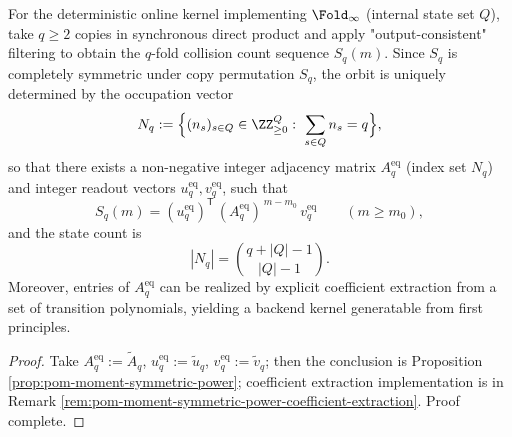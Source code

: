 \begin{conclusion}\label{con:xi-terminal-sympower-quotient-kernel-poly-state}
For the deterministic online kernel implementing \(\Fold_\infty\) (internal state set \(Q\)), take \(q\ge 2\) copies in synchronous direct product and apply "output-consistent" filtering to obtain the \(q\)-fold collision count sequence \(S_q(m)\).
Since \(S_q\) is completely symmetric under copy permutation \(S_q\), the orbit is uniquely determined by the occupation vector
\[
N_q:=\Bigl\{(n_s)_{s\in Q}\in\ZZ_{\ge 0}^{Q}:\ \sum_{s\in Q}n_s=q\Bigr\},
\]
so that there exists a non-negative integer adjacency matrix \(A^{\mathrm{eq}}_q\) (index set \(N_q\)) and integer readout vectors \(u^{\mathrm{eq}}_q,v^{\mathrm{eq}}_q\), such that
\[
S_q(m)= (u^{\mathrm{eq}}_q)^{\mathsf T}\,(A^{\mathrm{eq}}_q)^{\,m-m_0}\,v^{\mathrm{eq}}_q\qquad(m\ge m_0),
\]
and the state count is
\[
|N_q|=\binom{q+|Q|-1}{|Q|-1}.
\]
Moreover, entries of \(A^{\mathrm{eq}}_q\) can be realized by explicit coefficient extraction from a set of transition polynomials, yielding a backend kernel generatable from first principles.
\end{conclusion}
\begin{proof}[Proof]
Take \(A^{\mathrm{eq}}_q:=\widetilde A_q\), \(u^{\mathrm{eq}}_q:=\widetilde u_q\), \(v^{\mathrm{eq}}_q:=\widetilde v_q\); then the conclusion is Proposition \ref{prop:pom-moment-symmetric-power};
coefficient extraction implementation is in Remark \ref{rem:pom-moment-symmetric-power-coefficient-extraction}. Proof complete.
\end{proof}

